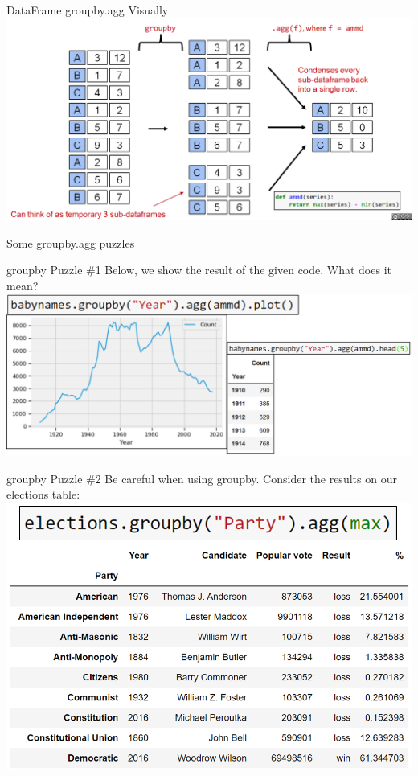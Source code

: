 \documentclass[aspectratio=169]{../latex_main/tntbeamer}  %
\begin{document}
    
    
    \begin{frame}{DataFrame groupby.agg Visually}
        \includegraphics[scale=.34]{Bild24}
    \end{frame}
    
    
    \begin{frame}{Some groupby.agg puzzles}
        
    \end{frame}
    
    
    
    \begin{frame}{groupby Puzzle \#1}
    Below, we show the result of the given code. What does it mean?
        \includegraphics[scale=.4]{Bild25}
    \end{frame}
    
    
    
    \begin{frame}{groupby Puzzle \#2}
    Be careful when using groupby. Consider the results on our elections table:
        \centering
        \includegraphics[scale=.38]{Bild26}
    \end{frame}
    
\end{document}

